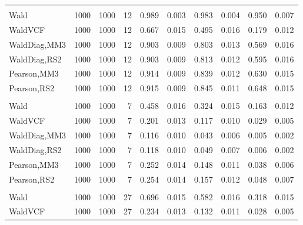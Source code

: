 \documentclass[
]{article}
\begin{document}
\begin{table}[H]
{\begin{tabular}[t]{lrrrrrrlrr}
\addlinespace[0.3em]
\multicolumn{10}{l}{\textbf{1F 15V}}\\
\hspace{1em}Wald & 1000 & 1000 & 12 & 0.989 & 0.003 & 0.983 & 0.004 & 0.950 & 0.007\\
\hspace{1em}WaldVCF & 1000 & 1000 & 12 & 0.667 & 0.015 & 0.495 & 0.016 & 0.179 & 0.012\\
\hspace{1em}WaldDiag,MM3 & 1000 & 1000 & 12 & 0.903 & 0.009 & 0.803 & 0.013 & 0.569 & 0.016\\
\hspace{1em}WaldDiag,RS2 & 1000 & 1000 & 12 & 0.903 & 0.009 & 0.813 & 0.012 & 0.595 & 0.016\\
\hspace{1em}Pearson,MM3 & 1000 & 1000 & 12 & 0.914 & 0.009 & 0.839 & 0.012 & 0.630 & 0.015\\
\hspace{1em}Pearson,RS2 & 1000 & 1000 & 12 & 0.915 & 0.009 & 0.845 & 0.011 & 0.648 & 0.015\\
\addlinespace[0.3em]
\multicolumn{10}{l}{\textbf{2F 10V}}\\
\hspace{1em}Wald & 1000 & 1000 & 7 & 0.458 & 0.016 & 0.324 & 0.015 & 0.163 & 0.012\\
\hspace{1em}WaldVCF & 1000 & 1000 & 7 & 0.201 & 0.013 & 0.117 & 0.010 & 0.029 & 0.005\\
\hspace{1em}WaldDiag,MM3 & 1000 & 1000 & 7 & 0.116 & 0.010 & 0.043 & 0.006 & 0.005 & 0.002\\
\hspace{1em}WaldDiag,RS2 & 1000 & 1000 & 7 & 0.118 & 0.010 & 0.049 & 0.007 & 0.006 & 0.002\\
\hspace{1em}Pearson,MM3 & 1000 & 1000 & 7 & 0.252 & 0.014 & 0.148 & 0.011 & 0.038 & 0.006\\
\hspace{1em}Pearson,RS2 & 1000 & 1000 & 7 & 0.254 & 0.014 & 0.157 & 0.012 & 0.048 & 0.007\\
\addlinespace[0.3em]
\multicolumn{10}{l}{\textbf{3F 15V}}\\
\hspace{1em}Wald & 1000 & 1000 & 27 & 0.696 & 0.015 & 0.582 & 0.016 & 0.318 & 0.015\\
\hspace{1em}WaldVCF & 1000 & 1000 & 27 & 0.234 & 0.013 & 0.132 & 0.011 & 0.028 & 0.005\\

\end{tabular}}
\end{table}
\end{document}
